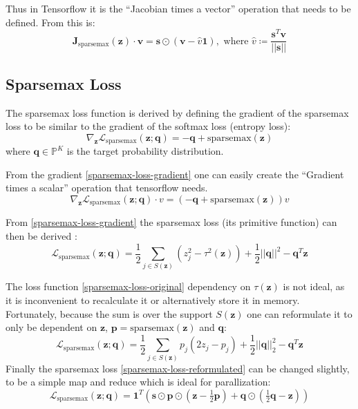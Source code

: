 Thus in Tensorflow it is the ``Jacobian times a vector'' operation that needs to be defined. From \cite{sparsemax} this is:
\begin{equation}
\mathbf{J}_{\mathrm{sparsemax}}(\mathbf{z}) \cdot \mathbf{v} = \mathbf{s} \odot (\mathbf{v} - \hat{v} \mathbf{1}), \text{  where } \hat{v} \coloneqq \frac{\mathbf{s}^T \mathbf{v}}{||\mathbf{s}||}
\end{equation}

\subsection{Sparsemax Loss}

The sparsemax loss function is derived by defining the gradient of the sparsemax loss to be similar to the gradient of the softmax loss (entropy loss):
\begin{equation}
\nabla_{\mathbf{z}} \mathcal{L}_{\mathrm{sparsemax}}(\mathbf{z}; \mathbf{q}) = -\mathbf{q} + \mathrm{sparsemax}(\mathbf{z})
\label{sparsemax-loss-gradient}
\end{equation}
where $\mathbf{q} \in \mathbb{P}^K$ is the target probability distribution.

From the gradient \eqref{sparsemax-loss-gradient} one can easily create the ``Gradient times a scalar'' operation that tensorflow needs.
\begin{equation}
\nabla_{\mathbf{z}} \mathcal{L}_{\mathrm{sparsemax}}(\mathbf{z}; \mathbf{q}) \cdot v = (-\mathbf{q} + \mathrm{sparsemax}(\mathbf{z})) v
\end{equation}

From \eqref{sparsemax-loss-gradient} the sparsemax loss (its primitive function) can then be derived \cite{sparsemax}:
\begin{equation}
\mathcal{L}_{\mathrm{sparsemax}}(\mathbf{z}; \mathbf{q}) = \frac{1}{2} \sum_{j \in S(\mathbf{z})} (z_j^2 - \tau^2(\mathbf{z})) + \frac{1}{2} ||\mathbf{q}||^2 - \mathbf{q}^T \mathbf{z}
\label{sparsemax-loss-original}
\end{equation}

The loss function \eqref{sparsemax-loss-original} dependency on $\tau(\mathbf{z})$ is not ideal, as it is inconvenient to recalculate it or alternatively store it in memory. Fortunately, because the sum is over the support $S(\mathbf{z})$ one can reformulate it to only be dependent on $\mathbf{z}$, $\mathbf{p} = \mathrm{sparsemax}(\mathbf{z})$ and $\mathbf{q}$:
\begin{equation}
\mathcal{L}_{\mathrm{sparsemax}}(\mathbf{z}; \mathbf{q}) = \frac{1}{2} \sum_{j \in S(\mathbf{z})} p_j (2 z_j - p_j) + \frac{1}{2} ||\mathbf{q}||_2^2 - \mathbf{q}^T \mathbf{z}
\label{sparsemax-loss-reformulated}
\end{equation}
Finally the sparsemax loss \eqref{sparsemax-loss-reformulated} can be changed slightly, to be a simple map and reduce which is ideal for parallization: 
\begin{equation}
\mathcal{L}_{\mathrm{sparsemax}}(\mathbf{z}; \mathbf{q}) = \mathbf{1}^T \left( \mathbf{s} \odot \mathbf{p} \odot \left(\mathbf{z} - \tfrac{1}{2} \mathbf{p}\right) + \mathbf{q} \odot \left(\tfrac{1}{2} \mathbf{q} - \mathbf{z}\right)\right)
\end{equation}

